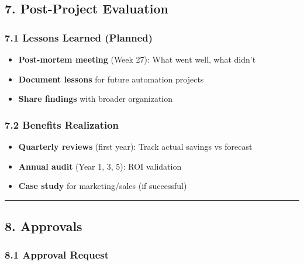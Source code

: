 \documentclass[
]{article}
\providecommand{\tightlist}{%
  \setlength{\itemsep}{0pt}\setlength{\parskip}{0pt}}
\begin{document}
\hypertarget{post-project-evaluation}{%
\subsection{7. Post-Project Evaluation}\label{post-project-evaluation}}

\hypertarget{lessons-learned-planned}{%
\subsubsection{7.1 Lessons Learned
(Planned)}\label{lessons-learned-planned}}

\begin{itemize}
\tightlist
\item
  \textbf{Post-mortem meeting} (Week 27): What went well, what didn't
\item
  \textbf{Document lessons} for future automation projects
\item
  \textbf{Share findings} with broader organization
\end{itemize}

\hypertarget{benefits-realization}{%
\subsubsection{7.2 Benefits Realization}\label{benefits-realization}}

\begin{itemize}
\tightlist
\item
  \textbf{Quarterly reviews} (first year): Track actual savings vs
  forecast
\item
  \textbf{Annual audit} (Year 1, 3, 5): ROI validation
\item
  \textbf{Case study} for marketing/sales (if successful)
\end{itemize}

\begin{center}\rule{0.5\linewidth}{0.5pt}\end{center}

\hypertarget{approvals}{%
\subsection{8. Approvals}\label{approvals}}

\hypertarget{approval-request}{%
\subsubsection{8.1 Approval Request}\label{approval-request}}
\end{document}
